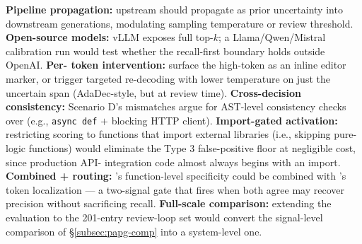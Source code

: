 \textbf{Pipeline propagation:} upstream \eps should propagate as
prior uncertainty into downstream generations, modulating sampling
temperature or review threshold. \textbf{Open-source models:} vLLM
exposes full top-$k$; a Llama/Qwen/Mistral calibration run would test
whether the recall-first boundary holds outside OpenAI. \textbf{Per-%
token intervention:} surface the high-\eps token as an inline editor
marker, or trigger targeted re-decoding with lower temperature on
just the uncertain span (AdaDec-style, but at review time).
\textbf{Cross-decision consistency:} Scenario D's mismatches argue
for AST-level consistency checks over \eps (e.g., \texttt{async def}
$+$ blocking HTTP client). \textbf{Import-gated activation:}
restricting \eps scoring to functions that import external libraries
(i.e., skipping pure-logic functions) would eliminate the Type 3
false-positive floor at negligible cost, since production API-%
integration code almost always begins with an import.
\textbf{Combined \papg + \eps routing:} \papg's function-level
specificity could be combined with \eps's token localization --- a
two-signal gate that fires when both agree may recover precision
without sacrificing recall. \textbf{Full-scale \papg comparison:}
extending the \papg evaluation to the 201-entry review-loop set
would convert the signal-level comparison of \S\ref{subsec:papg-comp}
into a system-level one.
